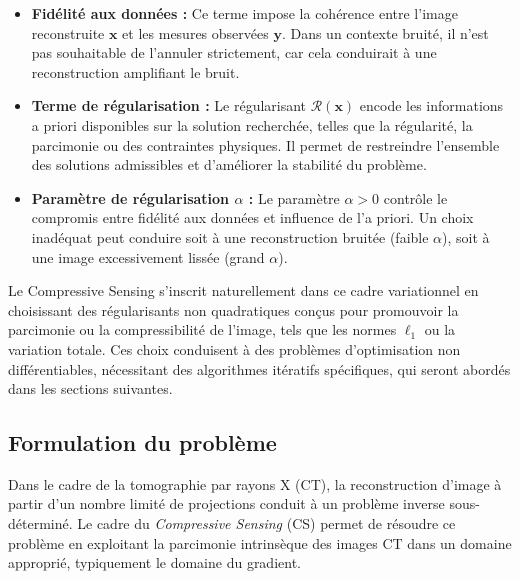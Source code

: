 \begin{itemize}[label=-]
    \item \textbf{Fidélité aux données :}
    Ce terme impose la cohérence entre l'image reconstruite $\mathbf{x}$ et les
    mesures observées $\mathbf{y}$. Dans un contexte bruité, il n'est pas souhaitable
    de l'annuler strictement, car cela conduirait à une reconstruction amplifiant
    le bruit.

    \item \textbf{Terme de régularisation :}
    Le régularisant $\mathcal{R}(\mathbf{x})$ encode les informations a priori
    disponibles sur la solution recherchée, telles que la régularité, la
    parcimonie ou des contraintes physiques. Il permet de restreindre l'ensemble
    des solutions admissibles et d'améliorer la stabilité du problème.

    \item \textbf{Paramètre de régularisation $\alpha$ :}
    Le paramètre $\alpha > 0$ contrôle le compromis entre fidélité aux données
    et influence de l'a priori. Un choix inadéquat peut conduire soit à une
    reconstruction bruitée (faible $\alpha$), soit à une image excessivement
    lissée (grand $\alpha$).
\end{itemize}
Le Compressive Sensing s'inscrit naturellement dans ce cadre variationnel en
choisissant des régularisants non quadratiques conçus pour promouvoir la
parcimonie ou la compressibilité de l'image, tels que les normes $\ell_1$ ou la
variation totale. 
Ces choix conduisent à des problèmes d'optimisation
non différentiables, nécessitant des algorithmes itératifs spécifiques, qui
seront abordés dans les sections suivantes.
\enlargethispage{\baselineskip}
\subsection{Formulation du problème}
Dans le cadre de la tomographie par rayons X (CT), la reconstruction d'image à partir d'un nombre limité de projections conduit à un problème inverse sous-déterminé. Le cadre du \emph{Compressive Sensing} (CS) permet de résoudre ce problème en exploitant la parcimonie intrinsèque des images CT dans un domaine approprié, typiquement le domaine du gradient.

